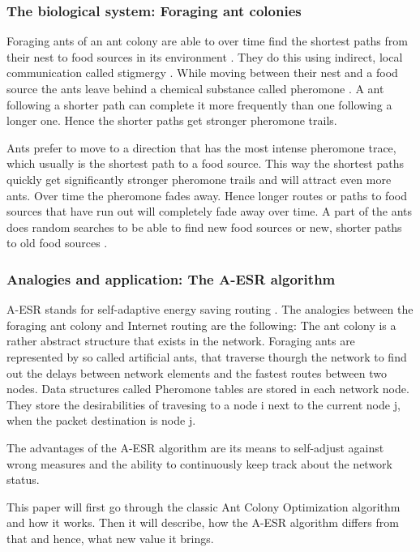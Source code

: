 \documentclass{IWORK2014}
\begin{document}
\subsubsection{The biological system: Foraging ant colonies}
Foraging ants of an ant colony are able to over time find the shortest paths from their nest to food sources in its environment \cite{dorigo1999ant, goss1989self}. They do this using indirect, local communication called stigmergy \cite{grasse1959reconstruction}. While moving between their nest and a food source the ants leave behind a chemical substance called pheromone \cite{ghosh2008aggregation}. A ant following a shorter path can complete it more frequently than one following a longer one. Hence the shorter paths get stronger pheromone trails.

Ants prefer to move to a direction that has the most intense pheromone trace, which usually is the shortest path to a food source. This way the shortest paths quickly get significantly stronger pheromone trails and will attract even more ants. Over time the pheromone fades away. Hence longer routes or paths to food sources that have run out will completely fade away over time. A part of the ants does random searches to be able to find new food sources or new, shorter paths to old food sources \cite{dressler2010bio}.

\subsubsection{Analogies and application: The A-ESR algorithm}
A-ESR stands for self-adaptive energy saving routing \cite{kim2012ant}. The analogies between the foraging ant colony and Internet routing are the following: The ant colony is a rather abstract structure that exists in the network. Foraging ants are represented by so called artificial ants, that traverse thourgh the network to find out the delays between network elements and the fastest routes between two nodes. Data structures called Pheromone tables are stored in each network node. They store the desirabilities of travesing to a node i next to the current node j, when the packet destination is node j.

The advantages of the A-ESR algorithm are its means to self-adjust against wrong measures and the ability to continuously keep track about the network status.

This paper will first go through the classic Ant Colony Optimization algorithm and how it works. Then it will describe, how the A-ESR algorithm differs from that and hence, what new value it brings. 
\end{document}
